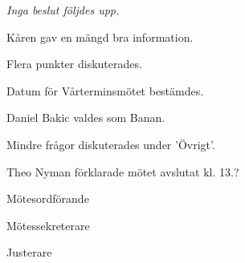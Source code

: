 \documentclass[10pt]{article}
\def\mo{Theo Nyman}
\def\ms{Hannes Björk}
\def\ji{?}
\begin{document}
\begin{paragrafer}



\textit{Inga beslut följdes upp.}





Kåren gav en mängd bra information.

Flera punkter diskuterades.

Datum för Vårterminsmötet bestämdes.

Daniel Bakic valdes som Banan.

Mindre frågor diskuterades under 'Övrigt'.

{\mo} förklarade mötet avslutat kl. 13.?
\end{paragrafer}

\hidesignfoot
\begin{signatures}{3}
\signature{\mo}{Mötesordförande}
\signature{\ms}{Mötessekreterare}
\signature{\ji}{Justerare}
\end{signatures}
\end{document}
